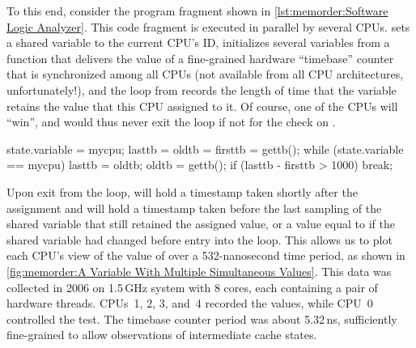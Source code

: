 \begin{fcvref}
To this end, consider the program fragment shown in
\cref{lst:memorder:Software Logic Analyzer}.
This code fragment is executed in parallel by several CPUs.
 sets a shared variable to the current CPU's ID, 
initializes several variables from a  function that
delivers the value of a fine-grained hardware ``timebase'' counter that is
synchronized among all CPUs (not available from all CPU architectures,
unfortunately!), and the loop from 
records the length of
time that the variable retains the value that this CPU assigned to it.
Of course, one of the CPUs will ``win'', and would thus never exit
the loop if not for the check on .
\end{fcvref}

\QuickQuizEnd

\begin{listing}[tbp]
\begin{fcvlabel}
\begin{VerbatimL}[commandchars=\\\[\]]
state.variable = mycpu;			\lnlbl[setid]
lasttb = oldtb = firsttb = gettb();	\lnlbl[init]
while (state.variable == mycpu) {	\lnlbl[loop:b]
	lasttb = oldtb;
	oldtb = gettb();
	if (lasttb - firsttb > 1000)	\lnlbl[iftmout]
		break;			\lnlbl[break]
}					\lnlbl[loop:e]
\end{VerbatimL}
\end{fcvlabel}
\caption{Software Logic Analyzer}
\label{lst:memorder:Software Logic Analyzer}
\end{listing}

Upon exit from the loop,  will hold a timestamp
taken shortly after the assignment and  will hold
a timestamp taken before the last sampling of the shared variable
that still retained the assigned value, or a value equal to 
if the shared variable had changed before entry into the loop.
This allows us to plot each CPU's view of the value of 
over a 532-nanosecond time period, as shown in
\cref{fig:memorder:A Variable With Multiple Simultaneous Values}.
This data was collected in 2006 on 1.5\,GHz  system with 8 cores,
each containing a pair of hardware threads.
CPUs~1, 2, 3, and~4 recorded the values, while CPU~0 controlled the test.
The timebase counter period was about 5.32\,ns, sufficiently fine-grained
to allow observations of intermediate cache states.

